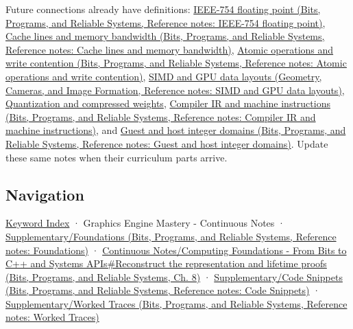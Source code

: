 Future connections already have definitions: \href{../01-Bits-Programs-and-Reliable-Systems/main.pdf\#nameddest=appendix-343615f49ddf}{IEEE-754 floating point (Bits, Programs, and Reliable Systems, Reference notes: IEEE-754 floating point)}, \href{../01-Bits-Programs-and-Reliable-Systems/main.pdf\#nameddest=appendix-e4ccdbab8320}{Cache lines and memory bandwidth (Bits, Programs, and Reliable Systems, Reference notes: Cache lines and memory bandwidth)}, \href{../01-Bits-Programs-and-Reliable-Systems/main.pdf\#nameddest=appendix-e12d1b03fefb}{Atomic operations and write contention (Bits, Programs, and Reliable Systems, Reference notes: Atomic operations and write contention)}, \href{../03-Geometry-Cameras-and-Image-Formation/main.pdf\#nameddest=appendix-3c7b1a56de01}{SIMD and GPU data layouts (Geometry, Cameras, and Image Formation, Reference notes: SIMD and GPU data layouts)}, \hyperref[appendix-fdc7879e8bf2]{Quantization and compressed weights}, \href{../01-Bits-Programs-and-Reliable-Systems/main.pdf\#nameddest=appendix-942ad41afb30}{Compiler IR and machine instructions (Bits, Programs, and Reliable Systems, Reference notes: Compiler IR and machine instructions)}, and \href{../01-Bits-Programs-and-Reliable-Systems/main.pdf\#nameddest=appendix-33e7a011b684}{Guest and host integer domains (Bits, Programs, and Reliable Systems, Reference notes: Guest and host integer domains)}. Update these same notes when their curriculum parts arrive.

\subsection{Navigation}\label{appendix-4ad47bdd269a-navigation}

\hypertarget{appendix-4ad47bdd269a-navigation}{}

\hyperref[appendix-a6d556a4ef50]{Keyword Index} · {Graphics Engine Mastery - Continuous Notes} · \href{../01-Bits-Programs-and-Reliable-Systems/main.pdf\#nameddest=appendix-fd090d982a15}{Supplementary/Foundations (Bits, Programs, and Reliable Systems, Reference notes: Foundations)} · \href{../01-Bits-Programs-and-Reliable-Systems/main.pdf\#nameddest=01-foundations-i-ch010-reconstruct-the-representation-and-lifetime-proofs}{Continuous Notes/Computing Foundations - From Bits to C++ and Systems APIs\#Reconstruct the representation and lifetime proofs (Bits, Programs, and Reliable Systems, Ch. 8)} · \href{../01-Bits-Programs-and-Reliable-Systems/main.pdf\#nameddest=appendix-4e2236f53445}{Supplementary/Code Snippets (Bits, Programs, and Reliable Systems, Reference notes: Code Snippets)} · \href{../01-Bits-Programs-and-Reliable-Systems/main.pdf\#nameddest=appendix-92ff77d4dfdc}{Supplementary/Worked Traces (Bits, Programs, and Reliable Systems, Reference notes: Worked Traces)}

